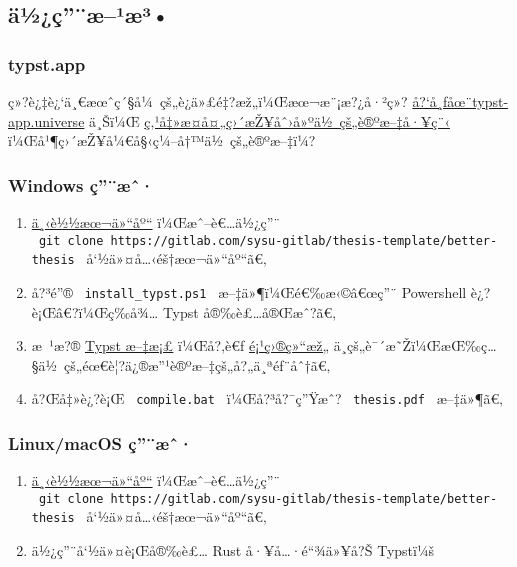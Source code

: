 \subsection{ä½¿ç''¨æ--¹æ³•}\label{uxe4uxbduxe7uxe6uxb9uxe6uxb3}

\subsubsection{typst.app}\label{typst.app}

ç»?è¿‡è¿`ä¸€æœˆç´§å¼~çš„è¿­ä»£é‡?æž„ï¼Œæœ¬æ¨¡æ?¿å·²ç»?
\href{https://typst.app/universe/package/modern-sysu-thesis}{å?{}`å¸ƒåœ¨typst-app.universe}
ä¸Šï¼Œ
\href{https://typst.app/app?template=modern-sysu-thesis&version=0.2.0}{ç‚¹å‡»æ­¤å¤„ç›´æŽ¥åˆ›å»ºä½~çš„è®ºæ--‡å·¥ç¨‹}
ï¼Œå¹¶ç›´æŽ¥å¼€å§‹ç¼--å†™ä½~çš„è®ºæ--‡ï¼?

\subsubsection{Windows ç''¨æˆ·}\label{windows-uxe7uxe6ux2c6}

\begin{enumerate}
\tightlist
\item
  \href{https://gitlab.com/sysu-gitlab/thesis-template/better-thesis/-/archive/main/better-thesis-main.zip}{ä¸‹è½½æœ¬ä»``åº``}
  ï¼Œæˆ--è€\ldots ä½¿ç''¨
  \texttt{\ git\ clone\ https://gitlab.com/sysu-gitlab/thesis-template/better-thesis\ }
  å`½ä»¤å\ldots‹éš†æœ¬ä»``åº``ã€‚
\item
  å?³é''® \texttt{\ install\_typst.ps1\ } æ--‡ä»¶ï¼Œé€‰æ‹©â€œç''¨
  Powershell è¿?è¡Œâ€?ï¼Œç­‰å¾\ldots{} Typst å®‰è£\ldots å®Œæˆ?ã€‚
\item
  æ~¹æ?® \href{https://typst.app/docs/}{Typst æ--‡æ¡£} ï¼Œå?‚è€ƒ
  \href{https://github.com/typst/packages/raw/main/packages/preview/modern-sysu-thesis/0.3.0/\#\%E9\%A1\%B9\%E7\%9B\%AE\%E7\%BB\%93\%E6\%9E\%84}{é¡¹ç›®ç»``æž„}
  ä¸­çš„è¯´æ˜Žï¼ŒæŒ‰ç\ldots§ä½~çš„éœ€è¦?ä¿®æ''¹è®ºæ--‡çš„å?„ä¸ªéƒ¨åˆ†ã€‚
\item
  å?Œå‡»è¿?è¡Œ \texttt{\ compile.bat\ } ï¼Œå?³å?¯ç''Ÿæˆ?
  \texttt{\ thesis.pdf\ } æ--‡ä»¶ã€‚
\end{enumerate}

\subsubsection{Linux/macOS ç''¨æˆ·}\label{linuxmacos-uxe7uxe6ux2c6}

\begin{enumerate}
\tightlist
\item
  \href{https://gitlab.com/sysu-gitlab/thesis-template/better-thesis/-/archive/main/better-thesis-main.zip}{ä¸‹è½½æœ¬ä»``åº``}
  ï¼Œæˆ--è€\ldots ä½¿ç''¨
  \texttt{\ git\ clone\ https://gitlab.com/sysu-gitlab/thesis-template/better-thesis\ }
  å`½ä»¤å\ldots‹éš†æœ¬ä»``åº``ã€‚
\item
  ä½¿ç''¨å`½ä»¤è¡Œå®‰è£\ldots{} Rust å·¥å\ldots·é``¾ä»¥å?Š Typstï¼š
\end{enumerate}

